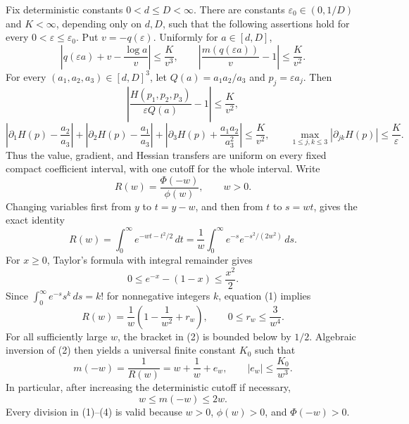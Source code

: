 Fix deterministic constants \(0<d\leq D<\infty\). There are constants \(\varepsilon _0\in(0,1/D)\) and \(K<\infty\), depending only on \(d,D\), such that the following assertions hold for every \(0<\varepsilon\leq\varepsilon _0\). Put \(v=-q(\varepsilon)\). Uniformly for \(a\in[d,D]\),
\[
 \left|q(\varepsilon a)+v-\frac{\log a}{v}\right|
 \leq \frac{K}{v^3},
 \qquad
 \left|\frac{m(q(\varepsilon a))}{v}-1\right|
 \leq \frac{K}{v^2}.
\]
For every \((a_1,a_2,a_3)\in[d,D]^3\), let \(Q(a)=a_1a_2/a_3\) and \(p_j=\varepsilon a_j\). Then
\[
 \left|\frac{H(p_1,p_2,p_3)}{\varepsilon Q(a)}-1\right|
 \leq\frac{K}{v^2},
\]
\[
 \left|\partial_1H(p)-\frac{a_2}{a_3}\right|
 +\left|\partial_2H(p)-\frac{a_1}{a_3}\right|
 +\left|\partial_3H(p)+\frac{a_1a_2}{a_3^2}\right|
 \leq\frac{K}{v^2},
 \qquad
 \max_{1\leq j,k\leq3}|\partial_{jk}H(p)|\leq\frac{K}{\varepsilon}.
\]
Thus the value, gradient, and Hessian transfers are uniform on every fixed compact coefficient interval, with one cutoff for the whole interval.
Write
\[
 R(w)=\frac{\Phi(-w)}{\phi(w)},\qquad w>0.
\]
Changing variables first from \(y\) to \(t=y-w\), and then from \(t\) to \(s=wt\), gives the exact identity
\[
 R(w)=\int_0^\infty e^{-wt-t^2/2}\,dt
 =\frac1w\int_0^\infty e^{-s}e^{-s^2/(2w^2)}\,ds.
\tag{1}
\]
For \(x\geq0\), Taylor's formula with integral remainder gives
\[
 0\leq e^{-x}-(1-x)\leq \frac{x^2}{2}.
\]
Since \(\int_0^\infty e^{-s}s^k\,ds=k!\) for nonnegative integers \(k\), equation (1) implies
\[
 R(w)=\frac1w\left(1-\frac1{w^2}+r_w\right),
 \qquad 0\leq r_w\leq\frac3{w^4}.
\tag{2}
\]
For all sufficiently large \(w\), the bracket in (2) is bounded below by \(1/2\). Algebraic inversion of (2) then yields a universal finite constant \(K_0\) such that
\[
 m(-w)=\frac1{R(w)}=w+\frac1w+e_w,
 \qquad |e_w|\leq\frac{K_0}{w^3}.
\tag{3}
\]
In particular, after increasing the deterministic cutoff if necessary,
\[
 w\leq m(-w)\leq2w.
\tag{4}
\]
Every division in (1)--(4) is valid because \(w>0\), \(\phi(w)>0\), and \(\Phi(-w)>0\).

